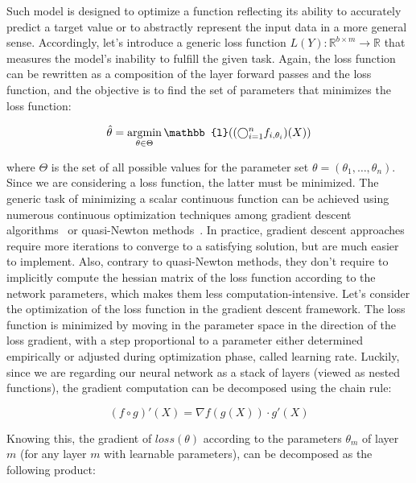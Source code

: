         Such model is designed to optimize a function reflecting its ability to accurately predict a target value or to abstractly represent the input 
        data in a more general sense. Accordingly, let's introduce a generic loss function $L(Y): \mathbb{R}^{b \times m} \rightarrow \mathbb{R}$ that measures 
        the model's inability to fulfill the given task. Again, the loss function can be rewritten as a composition of the layer forward passes and the loss
        function, and the objective is to find the set of parameters that minimizes the loss function:

        \begin{equation}
            \hat{\theta} = \argmin_{\theta \in \Theta} \mathbb{l}((\bigcirc_{i=1}^{n} f_{i, \theta_i})(X))
        \end{equation}

        where $\Theta$ is the set of all possible values for the parameter set $\theta = (\theta_1, \ldots, \theta_n)$.
        Since we are considering a loss function, the latter must be minimized. The generic task of minimizing a scalar continuous function can be achieved
        using numerous continuous optimization techniques  among gradient descent algorithms~\cite{DBLP:journals/corr/Ruder16}
        or quasi-Newton methods~\cite{LBFGS}. In practice, gradient descent approaches require more iterations to converge to a satisfying solution,
        but are much easier to implement. Also, contrary to quasi-Newton methods, they don't require to implicitly compute the hessian matrix of the loss
        function according to the network parameters, which makes them less computation-intensive. Let's consider the optimization of the loss function
        in the gradient descent framework. The loss function is minimized by moving in the parameter space in the direction of the loss gradient, with
        a step proportional to a parameter either determined empirically or adjusted during optimization phase, called learning rate.
        Luckily, since we are regarding our neural network as a stack of layers (viewed as nested functions), the gradient computation can be decomposed
        using the chain rule:

        \begin{equation} \label{eq:backprop}
            (f \circ g)'(X) = \nabla f(g(X)) \cdot g'(X)
        \end{equation}

        Knowing this, the gradient of $loss(\theta)$ according to the parameters $\theta_m$ of layer $m$ (for any layer $m$ with learnable parameters),
        can be decomposed as the following product:

